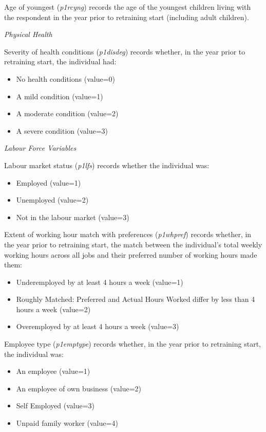 \documentclass[12pt, a4paper]{article}
\begin{document}
Age of youngest (\textit{p1\textunderscore{}rcyng}) records the age of the youngest children living with the respondent in the year prior to retraining start (including adult children). 

\emph{Physical Health}

Severity of health conditions (\textit{p1\textunderscore{}disdeg}) records whether, in the year prior to retraining start, the individual had:
\begin{itemize}
  \item No health conditions (value=0)
  \item A mild condition (value=1)
  \item A moderate condition (value=2)
  \item A severe condition (value=3)
\end{itemize}  
  
\emph{Labour Force Variables}

Labour market status (\textit{p1\textunderscore{}lfs}) records whether the individual was:
\begin{itemize}
  \item Employed (value=1)
  \item Unemployed (value=2)
  \item Not in the labour market (value=3)
\end{itemize} 

Extent of working hour match with preferences (\textit{p1\textunderscore{}whpref}) records whether, in the year prior to retraining start, the match between the individual’s total weekly working hours across all jobs and their preferred number of working hours made them:
\begin{itemize}
  \item Underemployed by at least 4 hours a week (value=1)
  \item Roughly Matched: Preferred and Actual Hours Worked differ by less than 4 hours a week (value=2)
  \item Overemployed by at least 4 hours a week (value=3)
\end{itemize}  

Employee type (\textit{p1\textunderscore{}emptype}) records whether, in the year prior to retraining start, the individual was:
\begin{itemize}
  \item An employee (value=1)
  \item An employee of own business (value=2)
  \item Self Employed (value=3)
  \item Unpaid family worker (value=4)
\end{itemize}  
\end{document}
